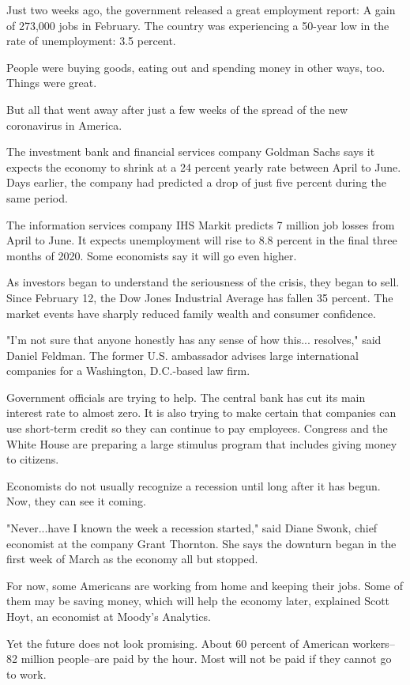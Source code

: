 Just two weeks ago, the government released a great employment report: A gain of 273,000 jobs in February. The country was experiencing a 50-year low in the rate of unemployment: 3.5 percent.

People were buying goods, eating out and spending money in other ways, too. Things were great.

But all that went away after just a few weeks of the spread of the new coronavirus in America.

The investment bank and financial services company Goldman Sachs says it expects the economy to shrink at a 24 percent yearly rate between April to June. Days earlier, the company had predicted a drop of just five percent during the same period.

The information services company IHS Markit predicts 7 million job losses from April to June. It expects unemployment will rise to 8.8 percent in the final three months of 2020. Some economists say it will go even higher.

As investors began to understand the seriousness of the crisis, they began to sell. Since February 12, the Dow Jones Industrial Average has fallen 35 percent. The market events have sharply reduced family wealth and consumer confidence.

"I'm not sure that anyone honestly has any sense of how this... resolves," said Daniel Feldman. The former U.S. ambassador advises large international companies for a Washington, D.C.-based law firm.

Government officials are trying to help. The central bank has cut its main interest rate to almost zero. It is also trying to make certain that companies can use short-term credit so they can continue to pay employees. Congress and the White House are preparing a large stimulus program that includes giving money to citizens.

Economists do not usually recognize a recession until long after it has begun. Now, they can see it coming.

"Never...have I known the week a recession started," said Diane Swonk, chief economist at the company Grant Thornton. She says the downturn began in the first week of March as the economy all but stopped.

For now, some Americans are working from home and keeping their jobs. Some of them may be saving money, which will help the economy later, explained Scott Hoyt, an economist at Moody's Analytics.

Yet the future does not look promising. About 60 percent of American workers--82 million people--are paid by the hour. Most will not be paid if they cannot go to work.

